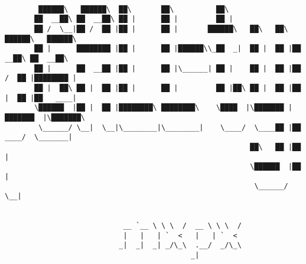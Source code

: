\documentclass[varwidth=\maxdimen,margin=0.5cm,multi={verbatim}]{standalone}
\begin{document}
\begin{verbatim}

        ██████\   ██████\  ██\       ██\          ██\
       ██  __██\ ██  __██\ ██ |      ██ |         ██ |
       ██ /  \__|██ /  ██ |██ |      ██ |       ██████\   ██\   ██\  ██████\   ██████\
       ██ |      ████████ |██ |      ██ |██████\\_██  _|  ██ |  ██ |██  __██\ ██  __██\
       ██ |      ██  __██ |██ |      ██ |\______| ██ |    ██ |  ██ |██ /  ██ |████████ |
       ██ |  ██\ ██ |  ██ |██ |      ██ |         ██ |██\ ██ |  ██ |██ |  ██ |██   ____|
       \██████  |██ |  ██ |████████\ ████████\    \████  |\███████ |███████  |\███████\
        \______/ \__|  \__|\________|\________|    \____/  \____██ |██  ____/  \_______|
                                                          ██\   ██ |██ |
                                                          \██████  |██ |
                                                           \______/ \__|


                            __ `__ \ \ \  /  __ \ \ \  /
                            |   |   | `  <   |   | `  <
                           _|  _|  _| _/\_\  .__/  _/\_\
                                            _|



\end{verbatim}
\end{document}
